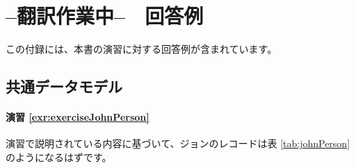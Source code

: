 \documentclass[
  11pt]{book}
\theoremstyle{definition}
\theoremstyle{definition}
\theoremstyle{definition}
\theoremstyle{definition}
\theoremstyle{remark}
\begin{document}
\chapter{--翻訳作業中--　回答例}\label{SuggestedAnswers}

この付録には、本書の演習に対する回答例が含まれています。

\section{共通データモデル}\label{Cdmanswers}

\subsubsection*{演習 \ref{exr:exerciseJohnPerson}}\label{ux6f14ux7fd2-refexrexercisejohnperson}

演習で説明されている内容に基づいて、ジョンのレコードは表 \ref{tab:johnPerson} のようになるはずです。
\end{document}
